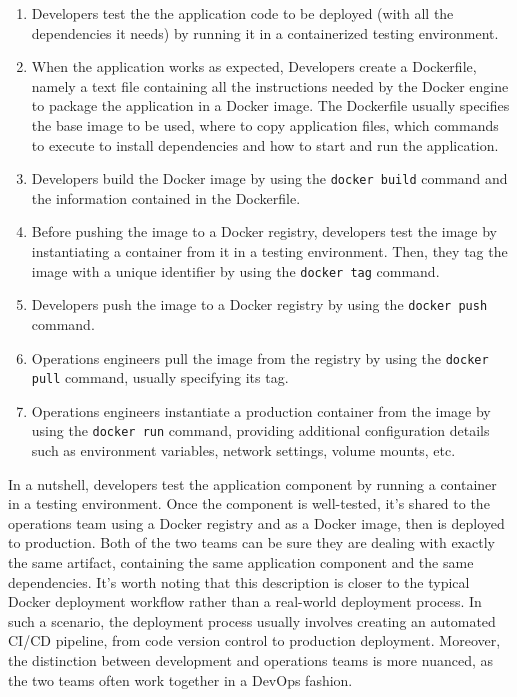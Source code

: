 \begin{enumerate}
    \item Developers test the the application code to be deployed (with all the dependencies it needs) by running it in a containerized testing environment. 
    \item When the application works as expected, Developers create a Dockerfile, namely a text file containing all the instructions needed by the Docker engine to package the application in a Docker image. The Dockerfile usually specifies the base image to be used, where to copy application files, which commands to execute to install dependencies and how to start and run the application.
    \item Developers build the Docker image by using the \texttt{docker build} command and the information contained in the Dockerfile.
    \item Before pushing the image to a Docker registry, developers test the image by instantiating a container from it in a testing environment. Then, they tag the image with a unique identifier by using the \texttt{docker tag} command.
    \item Developers push the image to a Docker registry by using the \texttt{docker push} command.
    \item Operations engineers pull the image from the registry by using the \texttt{docker pull} command, usually specifying its tag. 
    \item Operations engineers instantiate a production container from the image by using the \texttt{docker run} command, providing additional configuration details such as environment variables, network settings, volume mounts, etc.
\end{enumerate}

In a nutshell, developers test the application component by running a container in a testing environment. Once the component is well-tested, it's shared to the operations team using a Docker registry and as a Docker image, then is deployed to production. Both of the two teams can be sure they are dealing with exactly the same artifact, containing the same application component and the same dependencies.
It's worth noting that this description is closer to the typical Docker deployment workflow rather than a real-world deployment process. In such a scenario, the deployment process usually involves creating an automated CI/CD pipeline, from code version control to production deployment. 
Moreover, the distinction between development and operations teams is more nuanced, as the two teams often work together in a DevOps fashion.

